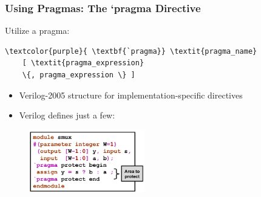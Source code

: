\documentclass[t, notes, xcolor=table]{beamer}
\begin{document}
\begin{frame}[fragile]
\frametitle{Using Pragmas: The `pragma Directive}
\scriptsize{
\begin{multicols}{2}
Utilize a pragma:
\begin{Verbatim}[commandchars=\\\{\}, tabsize=2]
\textcolor{purple}{	\textbf{`pragma}} \textit{pragma_name}
	[ \textit{pragma_expression} 
	\{, pragma_expression \} ]
\end{Verbatim}
\vspace{10pt}
\begin{itemize}
\item Verilog-2005 structure for implementation-specific directives
\vspace{10pt}
\item Verilog defines just a few:
\end{itemize}
\vfill
\columnbreak
\begin{figure}
    \includegraphics[width=0.45\textwidth]{img/11_pragma.png}
\end{figure}
\end{multicols}
}
\end{frame}
\end{document}
